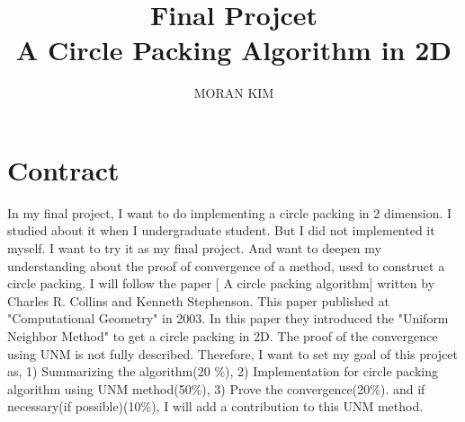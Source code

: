 \documentclass{SOP_KimMoran}
\begin{document}
\title[Final Projcet]
{Final Projcet\\ A Circle Packing Algorithm in 2D}


\author{MORAN KIM}
\address{Department of Mathematics\\
  Ewha Womans University\\South Korea}

\maketitle
\section{Contract}
In my final project, I want to do implementing a circle packing in 2 dimension. I studied about it when I undergraduate student. But I did not implemented it myself. I want to try it as my final project. And want to deepen my understanding about the proof of convergence of a method, used to construct a circle packing. I will follow the paper [ A circle packing algorithm] written by Charles R. Collins and  Kenneth Stephenson. This paper published at "Computational Geometry" in 2003. In this paper they introduced the "Uniform Neighbor Method" to get a circle packing in 2D. The proof of the convergence using UNM is not fully described. Therefore, I want to set my goal of this projcet as, 1) Summarizing the algorithm(20 \%), 2) Implementation for circle packing algorithm using UNM method(50\%), 3) Prove the convergence(20\%). and if necessary(if possible)(10\%), I will add a contribution to this UNM method.
\end{document}
